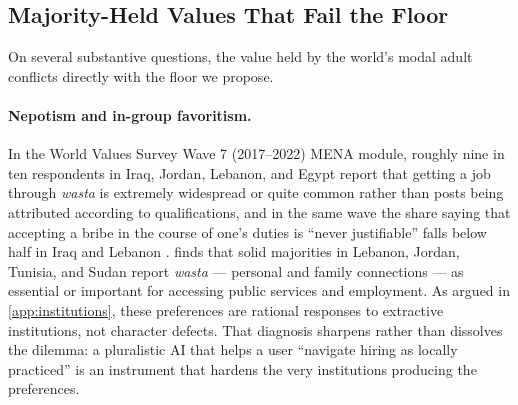 \documentclass{article}
\theoremstyle{plain}
\theoremstyle{definition}
\theoremstyle{remark}
\begin{document}
\subsection{Majority-Held Values That Fail the Floor}
\label{sec:majority-failing}

On several substantive questions, the value held by the world's modal adult conflicts directly with the floor we propose.

\paragraph{Nepotism and in-group favoritism.}
In the World Values Survey Wave 7 (2017--2022) MENA module, roughly nine in ten respondents in Iraq, Jordan, Lebanon, and Egypt report that getting a job through \emph{wasta} is extremely widespread or quite common rather than posts being attributed according to qualifications, and in the same wave the share saying that accepting a bribe in the course of one's duties is ``never justifiable'' falls below half in Iraq and Lebanon \citep{wvs7}. \citet{transparency2019gcbmena} finds that solid majorities in Lebanon, Jordan, Tunisia, and Sudan report \emph{wasta} --- personal and family connections --- as essential or important for accessing public services and employment. As argued in \cref{app:institutions}, these preferences are rational responses to extractive institutions, not character defects. That diagnosis sharpens rather than dissolves the dilemma: a pluralistic AI that helps a user ``navigate hiring as locally practiced'' is an instrument that hardens the very institutions producing the preferences.
\end{document}
